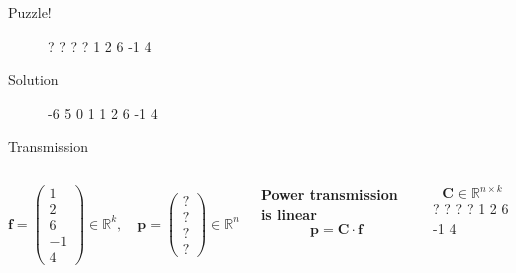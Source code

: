 \documentclass[10pt]{beamer}
\newcommand{\mat}[1]{\ensuremath{\boldsymbol{{#1}}}}
\begin{document}
\begin{frame}{Puzzle!}
    \begin{figure}
        \centering
        \graafjeduitsland
        {?}
        {?}
        {?}
        {?}
        {1}
        {2}
        {6}
        {-1}
        {4}
    \end{figure}
\end{frame}
\begin{frame}{Solution}
    \begin{figure}
        \centering
        \graafjeduitsland
        {-6}
        {5}
        {0}
        {1}
        {1}
        {2}
        {6}
        {-1}
        {4}
    \end{figure}
\end{frame}
\begin{frame}{Transmission}
    \begin{columns}[T,onlytextwidth]
    \[\mat{f}=\begin{pmatrix}
    1\\2\\6\\-1\\4
    \end{pmatrix} \in \mathbb{R}^k, \quad \mat{p}=\begin{pmatrix}
    ?\\?\\?\\?
    \end{pmatrix}\in \mathbb{R}^n\]
    {
    \begin{block}{\textbf{Power transmission is linear}}
        \[\mat{p} = \mat{C}\cdot \mat{f}\]
      \end{block}
      }
    \[\mat{C} \in \mathbb{R}^{n\times k}\]
    \graafjeduitsland
        {?}
        {?}
        {?}
        {?}
        {1}
        {2}
        {6}
        {-1}
        {4}
    \end{columns}
\end{frame}
\end{document}
